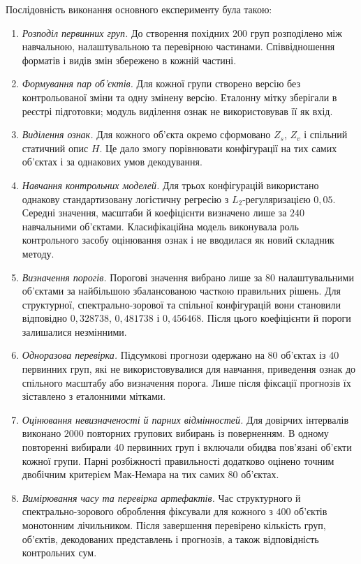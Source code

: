 Послідовність виконання основного експерименту була такою:

\begin{enumerate}
\item \textit{Розподіл первинних груп.} До створення похідних $200$ груп розподілено між навчальною, налаштувальною та перевірною частинами. Співвідношення форматів і видів змін збережено в кожній частині.

\item \textit{Формування пар об’єктів.} Для кожної групи створено версію без контрольованої зміни та одну змінену версію. Еталонну мітку зберігали в реєстрі підготовки; модуль виділення ознак не використовував її як вхід.

\item \textit{Виділення ознак.} Для кожного об’єкта окремо сформовано $Z_s$, $Z_v$ і спільний статичний опис $H$. Це дало змогу порівнювати конфігурації на тих самих об’єктах і за однакових умов декодування.

\item \textit{Навчання контрольних моделей.} Для трьох конфігурацій використано однакову стандартизовану логістичну регресію з $L_2$-регуляризацією $0{,}05$. Середні значення, масштаби й коефіцієнти визначено лише за $240$ навчальними об’єктами. Класифікаційна модель виконувала роль контрольного засобу оцінювання ознак і не вводилася як новий складник методу.

\item \textit{Визначення порогів.} Порогові значення вибрано лише за $80$ налаштувальними об’єктами за найбільшою збалансованою часткою правильних рішень. Для структурної, спектрально-зорової та спільної конфігурацій вони становили відповідно $0{,}328738$, $0{,}481738$ і $0{,}456468$. Після цього коефіцієнти й пороги залишалися незмінними.

\item \textit{Одноразова перевірка.} Підсумкові прогнози одержано на $80$ об’єктах із $40$ первинних груп, які не використовувалися для навчання, приведення ознак до спільного масштабу або визначення порога. Лише після фіксації прогнозів їх зіставлено з еталонними мітками.

\item \textit{Оцінювання невизначеності й парних відмінностей.} Для довірчих інтервалів виконано $2000$ повторних групових вибирань із поверненням. В одному повторенні вибирали $40$ первинних груп і включали обидва пов’язані об’єкти кожної групи. Парні розбіжності правильності додатково оцінено точним двобічним критерієм Мак-Немара на тих самих $80$ об’єктах.

\item \textit{Вимірювання часу та перевірка артефактів.} Час структурного й спектрально-зорового оброблення фіксували для кожного з $400$ об’єктів монотонним лічильником. Після завершення перевірено кількість груп, об’єктів, декодованих представлень і прогнозів, а також відповідність контрольних сум.
\end{enumerate}

